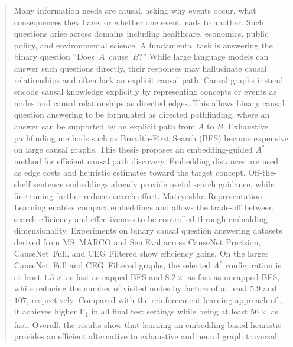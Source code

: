 \documentclass[english,bachelor,uks]{webisthesis} %
\begin{document}
\begin{frontmatter}


\begin{abstract}
Many information needs are causal, asking why events occur, what consequences they have, or whether one event leads to another. Such questions arise across domains including healthcare, economics, public policy, and environmental science. A fundamental task is answering the binary question \mbox{``Does $A$ cause $B$?''} While large language models can answer such questions directly, their responses may hallucinate causal relationships and often lack an explicit causal path. Causal graphs instead encode causal knowledge explicitly by representing concepts or events as nodes and causal relationships as directed edges. This allows binary causal question answering to be formulated as directed pathfinding, where an answer can be supported by an explicit path from $A$ to $B$. Exhaustive pathfinding methods such as Breadth-First Search (BFS) become expensive on large causal graphs. This thesis proposes an embedding-guided $A^*$ method for efficient causal path discovery. Embedding distances are used as edge costs and heuristic estimates toward the target concept. Off-the-shelf sentence embeddings already provide useful search guidance, while fine-tuning further reduces search effort. Matryoshka Representation Learning enables compact embeddings and allows the trade-off between search efficiency and effectiveness to be controlled through embedding dimensionality. Experiments on binary causal question answering datasets derived from \mbox{MS MARCO} and SemEval across CauseNet Precision, \mbox{CauseNet Full}, and CEG Filtered show efficiency gains. On the larger \mbox{CauseNet Full} and \mbox{CEG Filtered} graphs, the selected $A^*$ configuration is at least $1.3\times$ as fast as capped BFS and $8.2\times$ as fast as uncapped BFS, while reducing the number of visited nodes by factors of at least $5.9$ and $107$, respectively. Compared with the reinforcement learning approach of \citeauthor{bluebaum:2024}, it achieves higher F\textsubscript{1} in all final test settings while being at least $56\times$ as fast. Overall, the results show that learning an embedding-based heuristic provides an efficient alternative to exhaustive and neural graph traversal.
\end{abstract}



\tableofcontents





\end{frontmatter}
\end{document}
